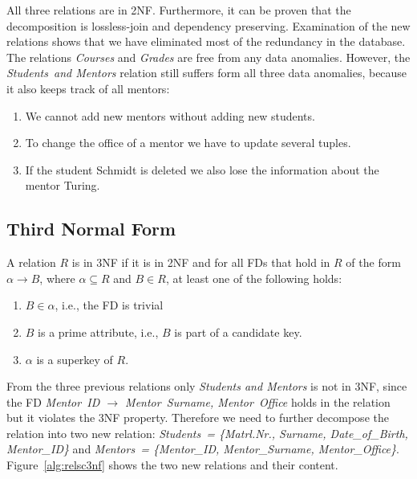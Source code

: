 All three relations are in 2NF. Furthermore, it can be proven that the
decomposition is lossless-join and dependency preserving. 
Examination of the new relations shows that we have eliminated most of the redundancy 
in the database. The relations \textit{Courses} and \textit{Grades} are free
from any data anomalies. However, the \textit{Students~and Mentors} relation still suffers form all three
data anomalies, because it also keeps track of all mentors:
\begin{enumerate}
  \item We cannot add new mentors without adding new students.
  \item To change the office of a mentor we have to update several tuples.
  \item If the student Schmidt is deleted we also lose the information about the mentor Turing.
\end{enumerate}
 
\subsection{Third Normal Form}
A relation $R$ is in 3NF if it is in 2NF and for all FDs that hold in $R$
of the form $\alpha \rightarrow B$, where $\alpha \subseteq  R$ and $B \in R$, 
at least one of the following holds: 
\begin{enumerate}
  \item $B \in \alpha$, i.e., the FD is trivial
  \item $B$ is a prime attribute, i.e., $B$ is part of a candidate key.
  \item $\alpha$ is a superkey of $R$.
\end{enumerate}

From the three previous relations only \textit{Students and Mentors} is not in 3NF, since 
the FD \textit{Mentor~ID $\rightarrow$ Mentor~Surname, Mentor~Office} holds in the relation but 
it violates the 3NF property. Therefore we need to further decompose the relation into two
new relation: \textit{Students~= \{Matrl.Nr., Surname, Date\_of\_Birth, Mentor\_ID\}} and
\textit{Mentors~= \{Mentor\_ID, Mentor\_Surname, Mentor\_Office\}}.
Figure~\ref{alg:relsc3nf} shows the two new relations and their content.

